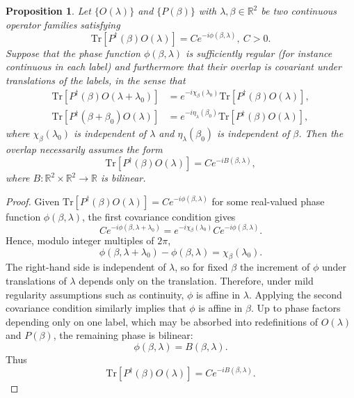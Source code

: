 \documentclass[aps,pra,onecolumn,nofootinbib,superscriptaddress,showpacs]{revtex4}
\newtheorem{prop}[theorem]{Proposition}
\begin{document}
\begin{prop}
Let $\{O(\lambda)\}$ and
$\{P(\beta)\}$ with $\lambda,\beta\in\mathbb R^2$ be two continuous operator families satisfying
\[
\mathrm{Tr}\!\left[P^\dagger(\beta)O(\lambda)\right]
=
Ce^{-i\phi(\beta,\lambda)},
~ C>0.
\]
Suppose that the phase function
$\phi(\beta,\lambda)$ is sufficiently regular (for instance
continuous in each label) and furthermore that their overlap is covariant under translations of
the labels, in the sense that
\begin{align}
\mathrm{Tr}\!\left[P^\dagger(\beta)O(\lambda+\lambda_0)\right]
&=
e^{-i\chi_\beta(\lambda_0)}
\mathrm{Tr}\!\left[P^\dagger(\beta)O(\lambda)\right],\\
\mathrm{Tr}\!\left[P^\dagger(\beta+\beta_0)O(\lambda)\right]
&=
e^{-i\eta_\lambda(\beta_0)}
\mathrm{Tr}\!\left[P^\dagger(\beta)O(\lambda)\right],
\end{align}
where \(\chi_\beta(\lambda_0)\) is independent of
\(\lambda\) and \(\eta_\lambda(\beta_0)\) is independent
of \(\beta\). Then the overlap necessarily assumes the form
\[
\mathrm{Tr}[P^\dagger(\beta)O(\lambda)]
=
Ce^{-iB(\beta,\lambda)},
\]
where \(B:\mathbb R^2\times\mathbb R^2\to\mathbb R\)
is bilinear.
\end{prop}
\begin{proof}
Given $\mathrm{Tr}\!\left[P^\dagger(\beta)O(\lambda)\right]
=
C e^{-i\phi(\beta,\lambda)}$ for some real-valued phase function $\phi(\beta,\lambda)$, the first covariance condition gives
\begin{equation}
C e^{-i\phi(\beta,\lambda+\lambda_0)}
=
e^{-i\chi_\beta(\lambda_0)}
C e^{-i\phi(\beta,\lambda)}.
\end{equation}
Hence, modulo integer multiples of $2\pi$,
\begin{equation}
\phi(\beta,\lambda+\lambda_0)-\phi(\beta,\lambda)
=
\chi_\beta(\lambda_0).
\end{equation}
The right-hand side is independent of $\lambda$, so for fixed $\beta$ the
increment of $\phi$ under translations of $\lambda$ depends only on the
translation. Therefore, under mild regularity assumptions such as continuity, $\phi$ is affine in $\lambda$.
Applying the second covariance condition similarly implies that $\phi$ is
affine in $\beta$. Up to phase factors depending only on one label, which may
be absorbed into redefinitions of $O(\lambda)$ and $P(\beta)$, the remaining
phase is bilinear:
\begin{equation}
\phi(\beta,\lambda)=B(\beta,\lambda).
\end{equation}
Thus
\begin{equation}
\mathrm{Tr}\!\left[P^\dagger(\beta)O(\lambda)\right]
=
C e^{-iB(\beta,\lambda)}.
\end{equation}
\end{proof}
\end{document}
